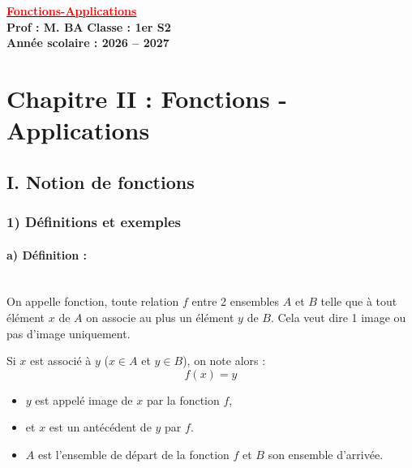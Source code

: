 \documentclass[12pt,a4paper]{article}
\newcounter{exemple} %
\begin{document}
\begin{center}
    \Large\textbf{\underline{\textcolor{red}{Fonctions-Applications}}}\\[-0.1cm]
    \normalsize\textbf{Prof : M. BA} \hfill \textbf{Classe : 1er S2}\\[-0.1cm]
    \textbf{Année scolaire : 2026 -- 2027}
\end{center}

\section*{\color{red}Chapitre II : Fonctions - Applications}

\subsection*{\color{darkred}I. Notion de fonctions}

\subsubsection*{\color{darkgreen} 1) Définitions et exemples}

\paragraph{\color{darkred}a) Définition :}~\\
On appelle \color{darkred}fonction\color{black}, toute relation \color{darkred}$f$\color{black} entre 2 ensembles {\color{darkred}$A$} et {\color{darkred}$B$} telle que à tout élément {\color{darkred}$x$} de {\color{darkred}$A$} on associe au plus un élément {\color{darkred}$y$} de {\color{darkred}$B$}. Cela veut dire 1 image ou pas d'image uniquement.

Si {\color{darkred}$x$} est associé à {\color{darkred}$y$} ($x \in A$ et $y \in B$), on note alors :
\[
\boxed{f(x) = y}
\]

\begin{itemize}
    \item {\color{darkred}$y$} est appelé image de {\color{darkred}$x$} par la fonction {\color{darkred}$f$},
    \item et {\color{darkred}$x$} est un antécédent de {\color{darkred}$y$} par {\color{darkred}$f$}.
    \item {\color{darkred}$A$} est l'ensemble de départ de la fonction {\color{darkred}$f$} et {\color{darkred}$B$} son ensemble d'arrivée.
\end{itemize}
\end{document}
